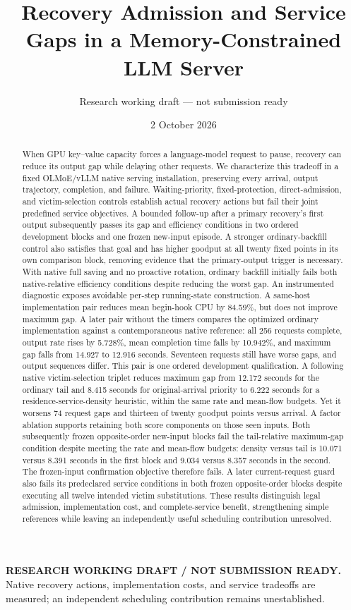 \documentclass[10pt]{article}
\title{Recovery Admission and Service Gaps in a Memory-Constrained LLM Server}
\author{Research working draft --- not submission ready}
\date{2 October 2026}
\begin{document}
\maketitle
\begin{center}
\textbf{RESEARCH WORKING DRAFT / NOT SUBMISSION READY.}
Native recovery actions, implementation costs, and service tradeoffs are measured; an independent scheduling contribution remains unestablished.
\end{center}

\begin{abstract}
When GPU key--value capacity forces a language-model request to pause, recovery can reduce its output gap while delaying other requests. We characterize this tradeoff in a fixed OLMoE/vLLM native serving installation, preserving every arrival, output trajectory, completion, and failure. Waiting-priority, fixed-protection, direct-admission, and victim-selection controls establish actual recovery actions but fail their joint predefined service objectives. A bounded follow-up after a primary recovery's first output subsequently passes its gap and efficiency conditions in two ordered development blocks and one frozen new-input episode. A stronger ordinary-backfill control also satisfies that goal and has higher goodput at all twenty fixed points in its own comparison block, removing evidence that the primary-output trigger is necessary. With native full saving and no proactive rotation, ordinary backfill initially fails both native-relative efficiency conditions despite reducing the worst gap. An instrumented diagnostic exposes avoidable per-step running-state construction. A same-host implementation pair reduces mean begin-hook CPU by 84.59\%, but does not improve maximum gap. A later pair without the timers compares the optimized ordinary implementation against a contemporaneous native reference: all 256 requests complete, output rate rises by 5.728\%, mean completion time falls by 10.942\%, and maximum gap falls from 14.927 to 12.916 seconds. Seventeen requests still have worse gaps, and output sequences differ. This pair is one ordered development qualification. A following native victim-selection triplet reduces maximum gap from 12.172 seconds for the ordinary tail and 8.415 seconds for original-arrival priority to 6.222 seconds for a residence-service-density heuristic, within the same rate and mean-flow budgets. Yet it worsens 74 request gaps and thirteen of twenty goodput points versus arrival. A factor ablation supports retaining both score components on those seen inputs. Both subsequently frozen opposite-order new-input blocks fail the tail-relative maximum-gap condition despite meeting the rate and mean-flow budgets: density versus tail is 10.071 versus 8.391 seconds in the first block and 9.034 versus 8.357 seconds in the second. The frozen-input confirmation objective therefore fails. A later current-request guard also fails its predeclared service conditions in both frozen opposite-order blocks despite executing all twelve intended victim substitutions. These results distinguish legal admission, implementation cost, and complete-service benefit, strengthening simple references while leaving an independently useful scheduling contribution unresolved.
\end{abstract}
\end{document}
